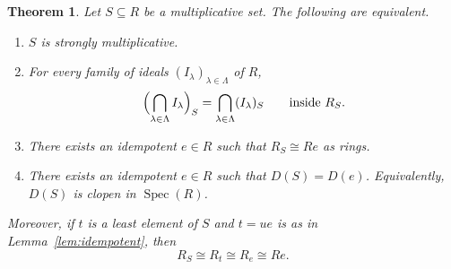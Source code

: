 \documentclass[11pt]{amsart}
\newtheorem{theorem}{Theorem}[section]
\theoremstyle{definition}
\theoremstyle{remark}
\newcommand{\Spec}{\operatorname{Spec}}
\begin{document}
\begin{theorem}\label{thm:main}
Let $S \subseteq R$ be a multiplicative set.
The following are equivalent.
\begin{enumerate}
\item $S$ is strongly multiplicative.
\item For every family of ideals $(I_\lambda)_{\lambda \in \Lambda}$ of $R$,
\[
\Bigl(\bigcap_{\lambda \in \Lambda} I_\lambda\Bigr)_S
=
\bigcap_{\lambda \in \Lambda} (I_\lambda)_S
\qquad\text{inside } R_S.
\]
\item There exists an idempotent $e \in R$ such that $R_S \cong Re$ as rings.
\item There exists an idempotent $e \in R$ such that $D(S)=D(e)$.
Equivalently, $D(S)$ is clopen in $\Spec(R)$.
\end{enumerate}
Moreover, if $t$ is a least element of $S$ and $t=ue$ is as in Lemma~\ref{lem:idempotent}, then
\[
R_S \cong R_t \cong R_e \cong Re.
\]
\end{theorem}
\end{document}
